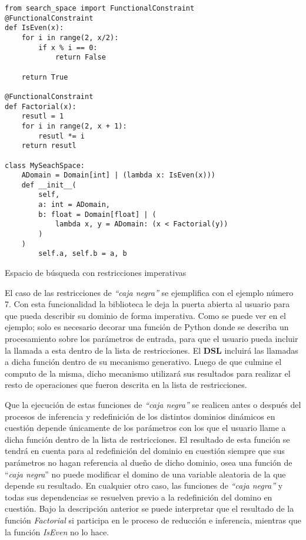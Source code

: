 \begin{listing}[!ht]
    \begin{verbatim}
from search_space import FunctionalConstraint
@FunctionalConstraint
def IsEven(x):
    for i in range(2, x/2):
        if x % i == 0:
            return False
        
    return True

@FunctionalConstraint
def Factorial(x):
    resutl = 1
    for i in range(2, x + 1):
        resutl *= i
    return resutl

class MySeachSpace:
    ADomain = Domain[int] | (lambda x: IsEven(x)))
    def __init__(
        self, 
        a: int = ADomain,
        b: float = Domain[float] | (
            lambda x, y = ADomain: (x < Factorial(y))
        )
    )
        self.a, self.b = a, b

    \end{verbatim}
    \caption{Espacio de búsqueda con restricciones imperativas}
    \label{ex:class_func}
\end{listing}


El caso de las restricciones de {\it “caja negra”} se ejemplifica con el ejemplo número 7. Con esta funcionalidad
la biblioteca le deja la puerta abierta al usuario para que pueda describir su dominio de forma imperativa.
Como se puede ver en el ejemplo; solo es necesario decorar una función de Python donde se describa un
procesamiento sobre los parámetros de entrada, para que el usuario pueda incluir la llamada a esta dentro de
la lista de restricciones. El {\bf DSL} incluirá las llamadas a dicha función dentro de su mecanismo generativo.
Luego de que culmine el computo de la misma, dicho mecanismo utilizará sus resultados para realizar el resto
de operaciones que fueron descrita en la lista de restricciones.

Que la ejecución de estas funciones de {\it “caja negra”} se realicen antes o después del procesos de
inferencia y redefinición de los distintos dominios dinámicos en cuestión depende únicamente de los
parámetros con los que el usuario llame a dicha función dentro de la lista de restricciones. El resultado
de esta función se tendrá en cuenta para al redefinición del dominio en cuestión siempre que sus parámetros
no hagan referencia al dueño de dicho dominio, osea una función de ``{\it caja negra}'' no puede modificar
el domino de una variable aleatoria de la que depende su resultado. En cualquier otro caso, las funciones de
    {\it “caja negra”} y todas sus dependencias se resuelven previo a la redefinición del domino en cuestión. Bajo
la descripción anterior se puede interpretar que el resultado de la función {\it Factorial} si participa en le
proceso de reducción e inferencia, mientras que la función {\it IsEven} no lo hace.

